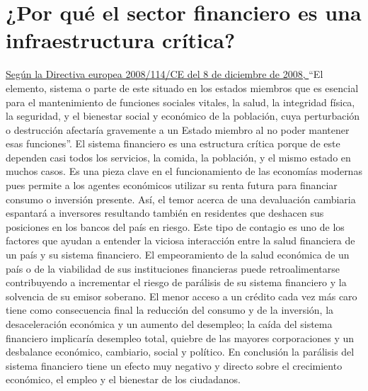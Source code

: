 \documentclass{article}
\begin{document}
\section{¿Por qué el sector financiero es una infraestructura crítica?}

\href{https://www.ccn-cert.cni.es/publico/InfraestructurasCriticaspublico/DirectivaEuropea2008-114-CE.pdf}{ Según la Directiva europea 2008/114/CE del 8 de diciembre de 2008, }
\newline
\newline
“El elemento, sistema o parte de este situado en los estados miembros que es esencial para el mantenimiento de funciones sociales vitales, la salud, la integridad física, la seguridad, y el bienestar social y económico de la población, cuya perturbación o destrucción afectaría gravemente a un Estado miembro al no poder mantener esas funciones”.
\newline
\newline
El sistema financiero es una estructura crítica porque de este dependen casi todos los servicios, la comida, la población, y el mismo estado en muchos casos.
 Es una pieza clave en el funcionamiento de las economías modernas pues permite a los agentes económicos utilizar su renta futura para financiar consumo o inversión presente.
Así, el temor acerca de una devaluación cambiaria espantará a inversores resultando también en residentes que deshacen sus posiciones en los bancos del país en riesgo. Este tipo de contagio es uno de los factores que ayudan a entender la viciosa interacción entre la salud financiera de un país y su sistema financiero. El empeoramiento de la salud económica de un país o de la viabilidad de sus instituciones financieras puede retroalimentarse contribuyendo a incrementar el riesgo de parálisis de su sistema financiero y la solvencia de su emisor soberano.
El menor acceso a un crédito cada vez más caro tiene como consecuencia final la reducción del consumo y de la inversión, la desaceleración económica y un aumento del desempleo; la caída del sistema financiero implicaría desempleo total, quiebre de las mayores corporaciones y un desbalance económico, cambiario, social y político.  
En conclusión la parálisis del sistema financiero tiene un efecto muy negativo y directo sobre el crecimiento económico, el empleo y el bienestar de los ciudadanos. 
\end{document}
